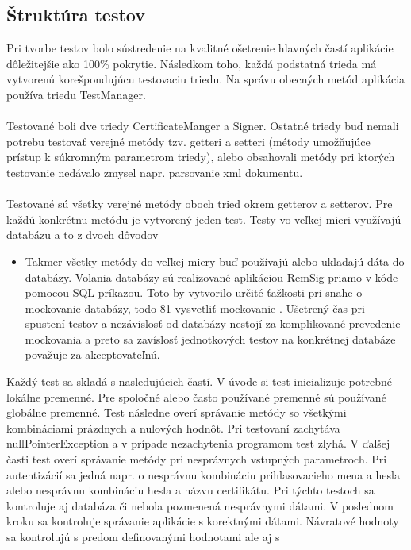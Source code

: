 \documentclass[
  digital, %
  table,   %
oneside,
  nolof,     %
  nolot,     %
]{fithesis3}
\begin{document}
\subsection{Štruktúra testov}
Pri tvorbe testov bolo sústredenie na kvalitné ošetrenie hlavných častí aplikácie dôležitejšie ako 100\% pokrytie. Následkom toho, každá podstatná trieda má vytvorenú korešpondujúcu testovaciu triedu. Na správu obecných metód aplikácia používa triedu TestManager. \paragraph{}
Testované boli dve triedy CertificateManger a Signer. Ostatné triedy buď nemali potrebu testovať verejné metódy tzv. getteri a setteri (métody umožňujúce prístup k súkromným parametrom triedy), alebo obsahovali metódy pri ktorých testovanie nedávalo zmysel napr. parsovanie xml dokumentu. \paragraph{}
Testované sú všetky verejné metódy oboch tried okrem getterov a setterov. Pre každú konkrétnu metódu je vytvorený jeden test. Testy vo veľkej mieri využívajú databázu a to z dvoch dôvodov 
\begin{itemize}
	\item Takmer všetky metódy do veľkej miery buď používajú alebo ukladajú dáta do databázy. Volania databázy sú realizované aplikáciou RemSig priamo v kóde pomocou SQL príkazou. Toto by vytvorilo určité ťažkosti pri snahe o mockovanie databázy, todo 81 vysvetliť mockovanie \cite{mockovanie}. Ušetrený čas pri spustení testov a nezávislosť od databázy nestojí za komplikované prevedenie mockovania a preto sa zavíslosť jednotkových testov na konkrétnej databáze považuje za akceptovateľnú.

\end{itemize}	
Každý test sa skladá s nasledujúcich častí. V úvode si test inicializuje potrebné lokálne premenné. Pre spoločné alebo často používané premenné sú používané globálne premenné. Test následne overí správanie metódy so všetkými kombináciami prázdnych a nulových hodnôt. Pri testovaní zachytáva nullPointerException a v prípade nezachytenia programom test zlyhá. V ďalšej časti test overí správanie metódy pri nesprávnych vstupných parametroch. Pri autentizácií sa jedná napr. o nesprávnu kombináciu prihlasovacieho mena a hesla alebo nesprávnu kombináciu hesla a názvu certifikátu. Pri týchto testoch sa kontroluje aj databáza či nebola pozmenená nesprávnymi dátami. V poslednom kroku sa kontroluje správanie aplikácie s korektnými dátami. Návratové hodnoty sa kontrolujú s predom definovanými hodnotami ale aj s   
\end{document}
